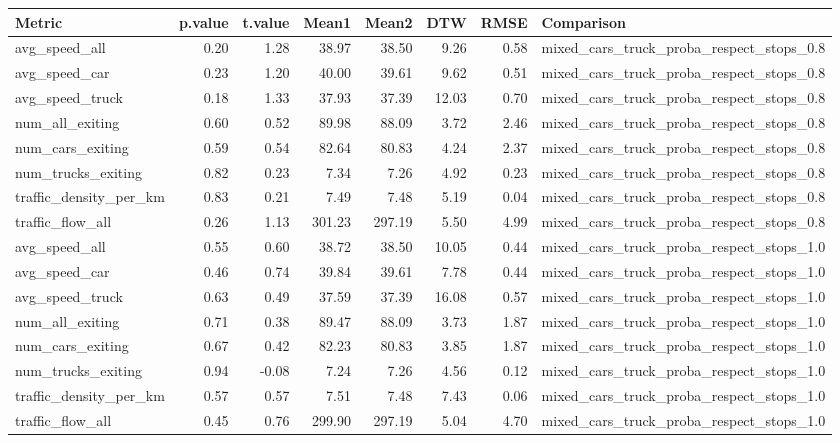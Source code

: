 \begin{table}[ht]
\centering
\begin{tabular}{lrrrrrrl}
  \hline
Metric & p.value & t.value & Mean1 & Mean2 & DTW & RMSE & Comparison \\ 
  \hline
avg\_speed\_all & 0.20 & 1.28 & 38.97 & 38.50 & 9.26 & 0.58 & mixed\_cars\_truck\_proba\_respect\_stops\_0.8 \\ 
  avg\_speed\_car & 0.23 & 1.20 & 40.00 & 39.61 & 9.62 & 0.51 & mixed\_cars\_truck\_proba\_respect\_stops\_0.8 \\ 
  avg\_speed\_truck & 0.18 & 1.33 & 37.93 & 37.39 & 12.03 & 0.70 & mixed\_cars\_truck\_proba\_respect\_stops\_0.8 \\ 
  num\_all\_exiting & 0.60 & 0.52 & 89.98 & 88.09 & 3.72 & 2.46 & mixed\_cars\_truck\_proba\_respect\_stops\_0.8 \\ 
  num\_cars\_exiting & 0.59 & 0.54 & 82.64 & 80.83 & 4.24 & 2.37 & mixed\_cars\_truck\_proba\_respect\_stops\_0.8 \\ 
  num\_trucks\_exiting & 0.82 & 0.23 & 7.34 & 7.26 & 4.92 & 0.23 & mixed\_cars\_truck\_proba\_respect\_stops\_0.8 \\ 
  traffic\_density\_per\_km & 0.83 & 0.21 & 7.49 & 7.48 & 5.19 & 0.04 & mixed\_cars\_truck\_proba\_respect\_stops\_0.8 \\ 
  traffic\_flow\_all & 0.26 & 1.13 & 301.23 & 297.19 & 5.50 & 4.99 & mixed\_cars\_truck\_proba\_respect\_stops\_0.8 \\ 
  avg\_speed\_all & 0.55 & 0.60 & 38.72 & 38.50 & 10.05 & 0.44 & mixed\_cars\_truck\_proba\_respect\_stops\_1.0 \\ 
  avg\_speed\_car & 0.46 & 0.74 & 39.84 & 39.61 & 7.78 & 0.44 & mixed\_cars\_truck\_proba\_respect\_stops\_1.0 \\ 
  avg\_speed\_truck & 0.63 & 0.49 & 37.59 & 37.39 & 16.08 & 0.57 & mixed\_cars\_truck\_proba\_respect\_stops\_1.0 \\ 
  num\_all\_exiting & 0.71 & 0.38 & 89.47 & 88.09 & 3.73 & 1.87 & mixed\_cars\_truck\_proba\_respect\_stops\_1.0 \\ 
  num\_cars\_exiting & 0.67 & 0.42 & 82.23 & 80.83 & 3.85 & 1.87 & mixed\_cars\_truck\_proba\_respect\_stops\_1.0 \\ 
  num\_trucks\_exiting & 0.94 & -0.08 & 7.24 & 7.26 & 4.56 & 0.12 & mixed\_cars\_truck\_proba\_respect\_stops\_1.0 \\ 
  traffic\_density\_per\_km & 0.57 & 0.57 & 7.51 & 7.48 & 7.43 & 0.06 & mixed\_cars\_truck\_proba\_respect\_stops\_1.0 \\ 
  traffic\_flow\_all & 0.45 & 0.76 & 299.90 & 297.19 & 5.04 & 4.70 & mixed\_cars\_truck\_proba\_respect\_stops\_1.0 \\ 
   \hline
\end{tabular}
\end{table}
